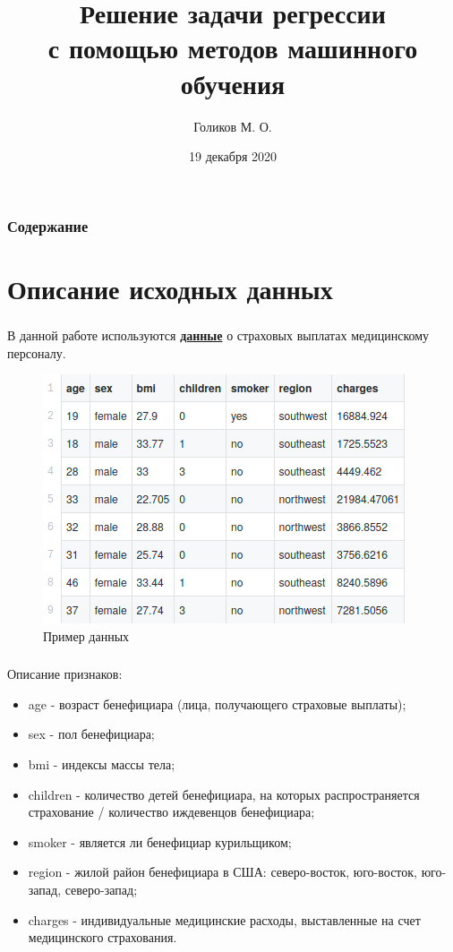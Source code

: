 \documentclass[c]{beamer}  %
\title[Решение задачи регрессии]{Решение задачи регрессии \\ с помощью методов машинного обучения}
\author{Голиков М. О.}
\date{19 декабря 2020}
\institute[ОГУ им. И. С. Тургенева]{<<ОРЛОВСКИЙ ГОСУДАРСТВЕННЫЙ УНИВЕРСИТЕТ \\ ИМЕНИ И.\,С.\,ТУРГЕНЕВА>>}
\begin{document}
	\frame[plain]{\titlepage}	%
  \begin{frame}
    \hypersetup{colorlinks=true,linkcolor=blue,urlcolor=blue}
		\frametitle{Содержание}
		\tableofcontents
  \end{frame}

	\section{Описание исходных данных}
	\begin{frame}
    \frametitle{\insertsection}

    В данной работе используются \textbf{\href{https://www.kaggle.com/mirichoi0218/insurance}{данные}} о
    страховых выплатах медицинскому персоналу.

    \begin{figure}[H]
			\centering
			\includegraphics[scale=0.45]{data_example.png}
			\caption{Пример данных}
			\label{img:data_example}
		\end{figure}
	\end{frame}

	\begin{frame}
		\frametitle{\insertsection}

		Описание признаков:
		\begin{itemize}
			\item age - возраст бенефициара (лица, получающего страховые выплаты);
			\item sex - пол бенефициара;
			\item bmi - индексы массы тела;
			\item children - количество детей бенефициара, на которых распространяется страхование / количество иждевенцов бенефициара;
			\item smoker - является ли бенефициар курильщиком;
			\item region - жилой район бенефициара в США: северо-восток, юго-восток, юго-запад, северо-запад;
			\item charges - индивидуальные медицинские расходы, выставленные на счет медицинского страхования.
		\end{itemize}
	\end{frame}
\end{document}
